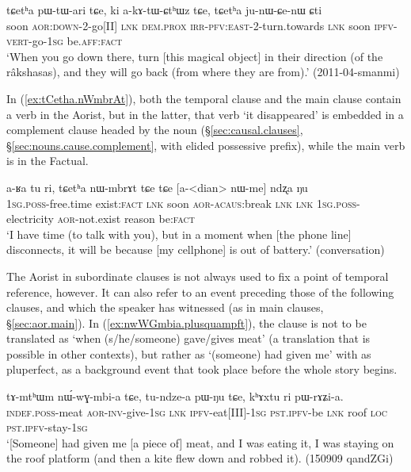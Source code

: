 \begin{exe}
\ex \label{ex:pWtari.nWtCu}
 \gll tɕetʰa pɯ-tɯ-ari tɕe, ki a-kɤ-tɯ-ɕtʰɯz tɕe, tɕetʰa ju-nɯ-ɕe-nɯ ɕti \\
 soon \textsc{aor}:\textsc{down}-2-go[II] \textsc{lnk} \textsc{dem}.\textsc{prox} \textsc{irr}-\textsc{pfv}:\textsc{east}-2-turn.towards \textsc{lnk} soon \textsc{ipfv}-\textsc{vert}-go-\textsc{1sg} be.\textsc{aff}:\textsc{fact} \\
 \glt `When you go down there, turn [this magical object] in their direction (of the râkshasas), and they will go back (from where they are from).' (2011-04-smanmi)
\end{exe}


In (\ref{ex:tCetha.nWmbrAt}), both the temporal clause and the main clause contain a verb in the Aorist, but in the latter, that verb  `it disappeared' is embedded in a complement clause headed by the noun  (§\ref{sec:causal.clauses}, §\ref{sec:nouns.cause.complement}, with elided possessive prefix), while the main verb  is in the Factual.

\begin{exe}
\ex \label{ex:tCetha.nWmbrAt}
 \gll a-ʁa tu ri, tɕetʰa nɯ-mbrɤt tɕe tɕe [a-<dian> nɯ-me] ndʐa ŋu \\
 \textsc{1sg}.\textsc{poss}-free.time exist:\textsc{fact} \textsc{lnk} soon \textsc{aor}-\textsc{acaus}:break \textsc{lnk} \textsc{lnk} \textsc{1sg}.\textsc{poss}-electricity \textsc{aor}-not.exist reason be:\textsc{fact} \\
\glt `I have time (to talk with you), but in a moment when [the phone line] disconnects, it will be because [my cellphone] is out of battery.' (conversation)
\end{exe}

The Aorist in subordinate clauses is not always used to fix a point of temporal reference, however. It can also refer to an event preceding those of the following clauses, and which the speaker has witnessed (as in main clauses, §\ref{sec:aor.main}). In (\ref{ex:nwWGmbia.plusquampft}), the clause  is not to be translated as `when (s/he/someone) gave/gives meat' (a translation that is possible in other contexts), but rather as `(someone) had given me' with as pluperfect, as a background event that took place before the whole story begins.

\begin{exe}
\ex \label{ex:nwWGmbia.plusquampft}
 \gll tɤ-mtʰɯm nɯ́-wɣ-mbi-a tɕe, tu-ndze-a pɯ-ŋu tɕe, kʰɤxtu ri pɯ-rɤʑi-a. \\
 \textsc{indef}.\textsc{poss}-meat \textsc{aor}-\textsc{inv}-give-\textsc{1sg} \textsc{lnk} \textsc{ipfv}-eat[III]-\textsc{1sg} \textsc{pst}.\textsc{ipfv}-be \textsc{lnk} roof \textsc{loc} \textsc{pst}.\textsc{ipfv}-stay-\textsc{1sg} \\
 \glt `[Someone] had given me [a piece of] meat, and I was eating it, I was staying on the roof platform (and then a kite flew down and robbed it). (150909 qandZGi)
\end{exe} 
 
